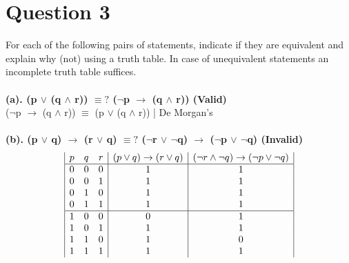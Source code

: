 \documentclass[a4paper]{article}
\begin{document}
\section{Question 3}
For each of the following pairs of statements, indicate if they are equivalent and explain why (not) using a truth table. In case of unequivalent statements an incomplete truth table suffices.
\\\\
\textbf{(a). (p $\vee $ (q  $\wedge $ r)) $\equiv ?$ ($\neg $p $\rightarrow $ (q $\wedge $ r)) (Valid)}\\
($\neg $p $\rightarrow $ (q $\wedge $ r)) $\equiv $ (p $\vee $ (q  $\wedge $ r)) | De Morgan's
\\\\
\textbf{(b). (p $\vee $ q) $\rightarrow $ (r $\vee $ q) $\equiv ?$ ($\neg $r $\vee $ $\neg $q) $\rightarrow $ ($\neg $p $\vee $ $\neg $q) (Invalid)}\\
\begin{displaymath}
    \begin{array}{|c c c|c|c|}
        p & q & r & (p \vee q) \rightarrow (r \vee q) & (\neg r \wedge \neg q) \rightarrow (\neg p \vee \neg q) \\
        \hline
        0 & 0 & 0 & 1                                 & 1                                                       \\
        0 & 0 & 1 & 1                                 & 1                                                       \\
        0 & 1 & 0 & 1                                 & 1                                                       \\
        0 & 1 & 1 & 1                                 & 1                                                       \\
        \hline
        1 & 0 & 0 & 0                                 & 1                                                       \\
        1 & 0 & 1 & 1                                 & 1                                                       \\
        1 & 1 & 0 & 1                                 & 0                                                       \\
        1 & 1 & 1 & 1                                 & 1                                                       \\
    \end{array}
\end{displaymath}
\end{document}
